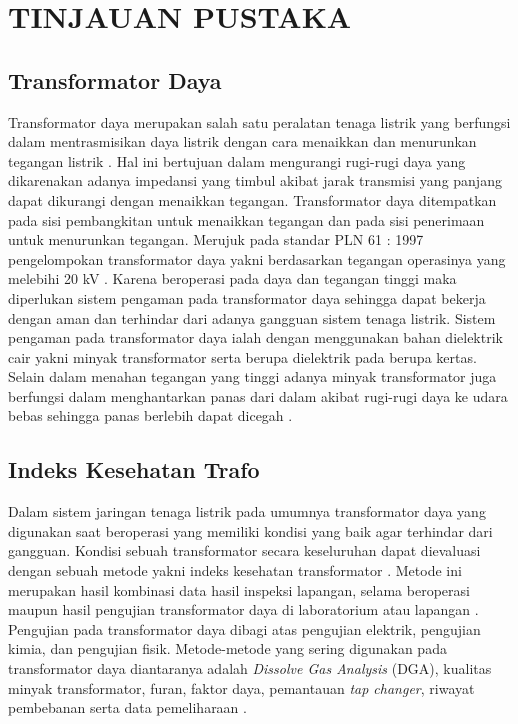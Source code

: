 \chapter{TINJAUAN PUSTAKA}
\label{BAB2:tinjauan}

\section{Transformator Daya}

Transformator daya merupakan salah satu peralatan tenaga listrik yang berfungsi dalam mentrasmisikan daya listrik dengan cara menaikkan dan menurunkan tegangan  listrik \cite{sutaryono2015analisa}. Hal ini bertujuan dalam mengurangi rugi-rugi daya yang dikarenakan adanya impedansi yang timbul akibat jarak transmisi yang panjang dapat dikurangi dengan menaikkan tegangan. Transformator daya ditempatkan pada sisi pembangkitan untuk menaikkan tegangan dan pada sisi penerimaan untuk menurunkan tegangan. Merujuk pada standar PLN 61 : 1997 pengelompokan transformator daya yakni berdasarkan tegangan operasinya yang melebihi 20 kV \cite{sutaryono2015analisa}. Karena beroperasi pada daya dan tegangan tinggi maka diperlukan sistem pengaman pada transformator daya sehingga dapat bekerja dengan aman dan terhindar dari adanya gangguan sistem tenaga listrik. Sistem pengaman pada transformator daya ialah dengan menggunakan bahan dielektrik cair yakni minyak transformator serta berupa dielektrik pada berupa kertas. Selain dalam menahan tegangan yang tinggi adanya minyak transformator juga berfungsi dalam menghantarkan panas dari dalam akibat rugi-rugi daya ke udara bebas sehingga panas berlebih dapat dicegah \cite{krause2012power}.




\section{Indeks Kesehatan Trafo}
Dalam sistem jaringan tenaga listrik pada umumnya transformator daya yang digunakan saat beroperasi yang memiliki kondisi yang baik agar terhindar dari gangguan. Kondisi sebuah transformator secara keseluruhan dapat dievaluasi dengan sebuah metode yakni indeks kesehatan transformator \cite{nurcahyanto2019analysis}. Metode ini merupakan hasil kombinasi data hasil inspeksi lapangan, selama beroperasi maupun hasil pengujian transformator daya di laboratorium atau lapangan \cite{ortiz2016health}. Pengujian pada transformator daya dibagi atas pengujian elektrik, pengujian kimia, dan pengujian fisik. Metode-metode yang sering digunakan pada transformator daya diantaranya adalah \textit{Dissolve Gas Analysis} (DGA), kualitas minyak transformator, furan, faktor daya, pemantauan \textit{tap changer}, riwayat pembebanan serta data pemeliharaan \cite{jahromi2009approach}.

